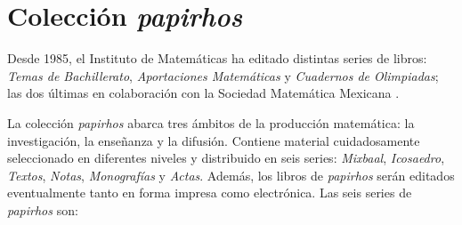 \documentclass[10pt,pagesize]{scrbook}
\numberwithin{equation}{chapter}
\begin{document}
\frontmatter\pagestyle{empty}

\chapter{Colección \emph{papirhos}}

Desde 1985, el Instituto de Matemáticas ha editado distintas series de
libros: \emph{Temas de Bachillerato}, \emph{Aportaciones Matemáticas}
y \emph{Cuadernos de Olimpiadas}; las dos últimas en colaboración con
la Sociedad Matemática Mexicana
.  

La colección \emph{papirhos} abarca tres ámbitos de la
producción matemática: la investigación, la enseñanza y la
difusión. Contiene material cuidadosamente seleccionado en diferentes
niveles y distribuido en seis series: \emph{Mixbaal},
\emph{Icosaedro}, \emph{Textos}, \emph{Notas},
\emph{Monografías} y \emph{Actas}. Además, los libros de \emph{papirhos} serán
editados eventualmente tanto en forma impresa como electrónica.  Las seis series de
\emph{papirhos} son:
	
\end{document}
